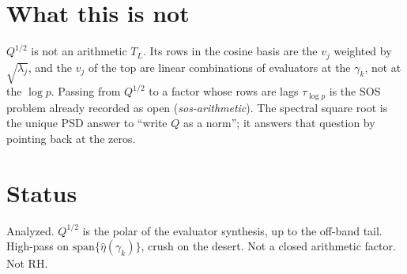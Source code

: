 \documentclass[11pt]{article}
\begin{document}
\section{What this is not}
$Q^{1/2}$ is not an arithmetic $T_L$. Its rows in the cosine basis
are the $v_j$ weighted by $\sqrt{\lambda_j}$, and the $v_j$ of the
top are linear combinations of evaluators at the $\gamma_k$, not at
the $\log p$. Passing from $Q^{1/2}$ to a factor whose rows are lags
$\tau_{\log p}$ is the SOS problem already recorded as open
(\emph{sos-arithmetic}). The spectral square root is the unique PSD
answer to ``write $Q$ as a norm''; it answers that question by
pointing back at the zeros.

\section*{Status}
Analyzed. $Q^{1/2}$ is the polar of the evaluator synthesis, up to
the off-band tail. High-pass on $\mathrm{span}\{\hat\eta(\gamma_k)\}$,
crush on the desert. Not a closed arithmetic factor. Not RH.
\end{document}
